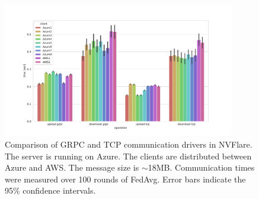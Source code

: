 \documentclass[11pt]{article}
\begin{document}
\begin{figure}[htbp]
    \centering
    \includegraphics[width=0.90\textwidth]{submissions/HolgerRoth/fig/comm_protocols1.pdf}
    \caption{Comparison of GRPC and TCP communication drivers in NVFlare. The server is running on Azure. The clients are distributed between Azure and AWS. The message size is $\sim$18MB. Communication times were measured over 100 rounds of FedAvg. Error bars indicate the 95\% confidence intervals. \label{fig:cloud_comm}}
\end{figure}
\end{document}
